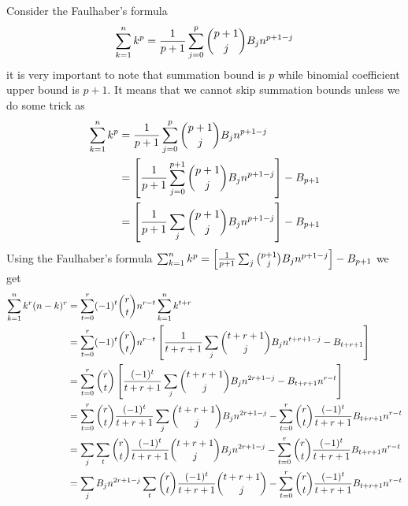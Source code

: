 Consider the Faulhaber's formula
\begin{equation}
    \sum_{k=1}^{n} k^{p} = \frac{1}{p+1}\sum_{j=0}^{p} \binom{p+1}{j} {B}\sb{j} n^{p+1-j}\label{eq:equation3}
\end{equation}
it is very important to note that summation bound is $p$ while binomial coefficient upper bound is $p+1$.
It means that we cannot skip summation bounds unless we do some trick as
\begin{equation}
    \begin{split}
        \sum_{k=1}^{n} k^{p} &= \frac{1}{p+1}\sum_{j=0}^{p} \binom{p+1}{j} {B}\sb{j} n^{p+1-j} \\
        &= \left[ \frac{1}{p+1}\sum_{j=0}^{p+1} \binom{p+1}{j} {B}\sb{j} n^{p+1-j} \right] - {B}\sb{p+1} \\
        &= \left[ \frac{1}{p+1}\sum_{j} \binom{p+1}{j} {B}\sb{j} n^{p+1-j} \right] - {B}\sb{p+1} \\
    \end{split}\label{eq:faulhaber-formula}
\end{equation}
Using the Faulhaber's formula
$\sum_{k=1}^{n} k^{p} = \left[ \frac{1}{p+1}\sum_{j} \binom{p+1}{j} {B}\sb{j} n^{p+1-j} \right] - {B}\sb{p+1}$
we get
\begin{equation}
    \begin{split}
        \sum_{k=1}^{n} k^{r} (n-k)^{r}
        &= \sum_{t=0}^{r} (-1)^t \binom{r}{t} n^{r-t} \sum_{k=1}^{n} k^{t+r} \\
        &= \sum_{t=0}^{r} (-1)^t \binom{r}{t} n^{r-t} \left[ \frac{1}{t+r+1} \sum_{j} \binom{t+r+1}{j} {B}\sb{j} n^{t+r+1-j} - {B}\sb{t+r+1} \right] \\
        &= \sum_{t=0}^{r} \binom{r}{t} \left[ \frac{(-1)^t}{t+r+1} \sum_{j} \binom{t+r+1}{j} {B}\sb{j} n^{2r+1-j} - {B}\sb{t+r+1} n^{r-t} \right] \\
        &= \sum_{t=0}^{r} \binom{r}{t} \frac{(-1)^t}{t+r+1} \sum_{j} \binom{t+r+1}{j} {B}\sb{j} n^{2r+1-j} - \sum_{t=0}^{r} \binom{r}{t} \frac{(-1)^t}{t+r+1} {B}\sb{t+r+1} n^{r-t} \\
        &= \sum_{j} \sum_{t} \binom{r}{t} \frac{(-1)^t}{t+r+1} \binom{t+r+1}{j} {B}\sb{j} n^{2r+1-j} - \sum_{t=0}^{r} \binom{r}{t} \frac{(-1)^t}{t+r+1} {B}\sb{t+r+1} n^{r-t} \\
        &= \sum_{j} {B}\sb{j} n^{2r+1-j} \sum_{t} \binom{r}{t} \frac{(-1)^t}{t+r+1} \binom{t+r+1}{j} - \sum_{t=0}^{r} \binom{r}{t} \frac{(-1)^t}{t+r+1} {B}\sb{t+r+1} n^{r-t}
    \end{split}\label{eq:equation4}
\end{equation}
